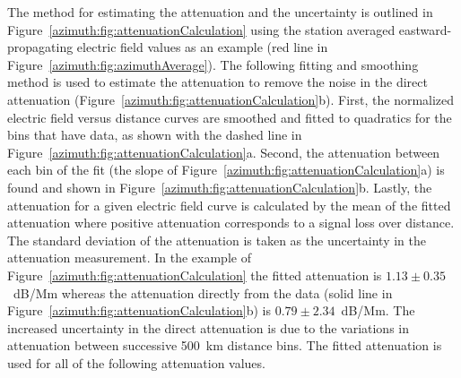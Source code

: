 The method for estimating the attenuation and the uncertainty is outlined in Figure~\ref{azimuth:fig:attenuationCalculation} using the station averaged eastward-propagating electric field values as an example (red line in Figure~\ref{azimuth:fig:azimuthAverage}).
The following fitting and smoothing method is used to estimate the attenuation to remove the noise in the direct attenuation (Figure~\ref{azimuth:fig:attenuationCalculation}b). 
First, the normalized electric field versus distance curves are smoothed and fitted to quadratics for the bins that have data, as shown with the dashed line in Figure~\ref{azimuth:fig:attenuationCalculation}a.
Second, the attenuation between each bin of the fit (the slope of Figure~\ref{azimuth:fig:attenuationCalculation}a) is found and shown in Figure~\ref{azimuth:fig:attenuationCalculation}b.
Lastly, the attenuation for a given electric field curve is calculated by the mean of the fitted attenuation where positive attenuation corresponds to a signal loss over distance.
The standard deviation of the attenuation is taken as the uncertainty in the attenuation measurement.
In the example of Figure~\ref{azimuth:fig:attenuationCalculation} the fitted attenuation is $1.13\pm0.35$~dB/Mm whereas the attenuation directly from the data (solid line in Figure~\ref{azimuth:fig:attenuationCalculation}b) is $0.79\pm2.34$~dB/Mm.
The increased uncertainty in the direct attenuation is due to the variations in attenuation between successive 500~km distance bins.
The fitted attenuation is used for all of the following attenuation values.


